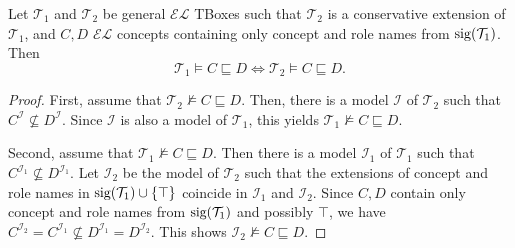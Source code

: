 \begin{lemma}
	Let $\mathcal{T}_1$ and $\mathcal{T}_2$ be general $\mathcal{EL}$ TBoxes such that
	 $\mathcal{T}_2$ is a conservative extension of $\mathcal{T}_1$,
	 and $C, D$ $\mathcal{EL}$ concepts containing only concept and role names from $\operatorname{\text{sig}}(\mathcal{T}_1)$.
	 Then
	  \[
	 \mathcal{T}_1 \vDash C \sqsubseteq D \iff \mathcal{T}_2 \vDash C \sqsubseteq D
	 .\]
\end{lemma}
\begin{proof}
	First, assume that $\mathcal{T}_2 \not\vDash C \sqsubseteq D$.
	Then, there is a model $\mathcal{I}$ of $\mathcal{T}_2$ such that $C^\mathcal{I} \not\subseteq D^\mathcal{I}$.
	Since $\mathcal{I}$ is also a model of $\mathcal{T}_1$, this yields $\mathcal{T}_1 \not\vDash C \sqsubseteq D$.

	Second, assume that $\mathcal{T}_1 \not\vDash C \sqsubseteq D$.
	Then there is a model $\mathcal{I}_1$ of $\mathcal{T}_1$ such that $C^{\mathcal{I}_1} \not \subseteq D^{\mathcal{I}_1}$.
	Let $\mathcal{I}_2$ be the model of $\mathcal{T}_2$ such that
	the extensions of concept and role names in $\operatorname{\text{sig}}(\mathcal{T}_1) \cup \left\{ \top \right\}$ coincide in $\mathcal{I}_1$ and $\mathcal{I}_2$.
	Since $C, D$ contain only concept and role names from $\operatorname{\text{sig}}(\mathcal{T}_1)$ and possibly $\top$,
	we have $C^{\mathcal{I}_2} = C^{\mathcal{I}_1} \not \subseteq D^{\mathcal{I}_1} = D^{\mathcal{I}_2}$.
	This shows $\mathcal{I}_2 \not\vDash C \sqsubseteq D$.
\end{proof}


